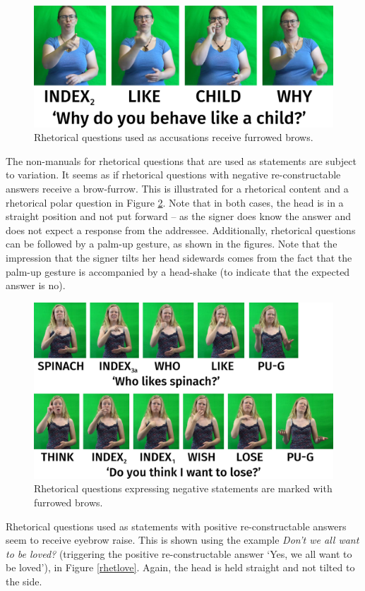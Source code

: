 \begin{figure}[bt]
\centering
	\includegraphics[width=1.0\textwidth]{accusation.jpg}
	\caption{Rhetorical questions used as accusations receive furrowed brows.}
	\label{accusation}
\end{figure}

The non-manuals for rhetorical questions that are used as statements are subject to variation. It seems as if rhetorical questions with negative re-constructable answers receive a brow-furrow. This is illustrated for a rhetorical content and a rhetorical polar question in Figure \ref{rhetorical}. Note that in both cases, the head is in a straight position and not put forward -- as the signer does know the answer and does not expect a response from the addressee. Additionally, rhetorical questions can be followed by a palm-up gesture, as shown in the figures. Note that the impression that the signer tilts her head sidewards comes from the fact that the palm-up gesture is accompanied by a head-shake (to indicate that the expected answer is no). 

\begin{figure}[bt]
\centering
	\includegraphics[width=1.0\textwidth]{rhetorical.jpg}
	\caption{Rhetorical questions expressing negative statements are marked with furrowed brows.}
	\label{rhetorical}
\end{figure}
Rhetorical questions used as statements with positive re-constructable answers seem to receive eyebrow raise. This is shown using the example \textit{Don't we all want to be loved?} (triggering the positive re-constructable answer `Yes, we all want to be loved'), in Figure \ref{rhetlove}. Again, the head is held straight and not tilted to the side. 

